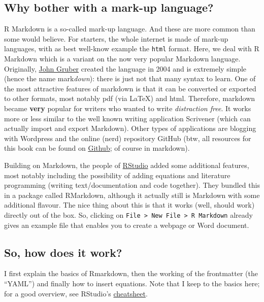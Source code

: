 \documentclass[]{article}
\theoremstyle{definition}
\theoremstyle{definition}
\theoremstyle{definition}
\theoremstyle{remark}
\begin{document}
\subsection{Why bother with a mark-up
language?}\label{why-bother-with-a-mark-up-language}

R Markdown is a so-called mark-up language. And these are more common
than some would believe. For starters, the whole internet is made of
mark-up languages, with as best well-know example the \texttt{html}
format. Here, we deal with R Markdown which is a variant on the now very
popular Markdown language. Originally,
\href{https://daringfireball.net/projects/markdown/syntax}{John Gruber}
created the language in 2004 and is extremely simple (hence the name
mark\emph{down}): there is just not that many syntax to learn. One of
the most attractive features of markdown is that it can be converted or
exported to other formats, most notably pdf (via LaTeX) and html.
Therefore, markdown became \textbf{very} popular for writers who wanted
to write \emph{distraction free}. It works more or less similar to the
well known writing application Scrivener (which can actually import and
export Markdown). Other types of applications are blogging with
Wordpress and the online (nerd) repository GitHub (btw, all resources
for this book can be found on
\href{https://github.com/Thdegraaff/ResearchTools}{Github}; of course in
markdown).

Building on Markdown, the people of
\href{http://rmarkdown.rstudio.com}{RStudio} added some additional
features, most notably including the possibility of adding equations and
literature programming (writing text/documentation and code together).
They bundled this in a package called RMarkdown, although it actually
still is Markdown with some additional flavour. The nice thing about
this is that it works (well, should work) directly out of the box. So,
clicking on
\texttt{File\ \textgreater{}\ New\ File\ \textgreater{}\ R\ Markdown}
already gives an example file that enables you to create a webpage or
Word document.

\subsection{So, how does it work?}\label{so-how-does-it-work}

I first explain the basics of Rmarkdown, then the working of the
frontmatter (the ``YAML'') and finally how to insert equations. Note
that I keep to the basics here; for a good overview, see RStudio's
\href{https://www.rstudio.com/wp-content/uploads/2016/03/rmarkdown-cheatsheet-2.0.pdf}{cheatsheet}.
\end{document}
